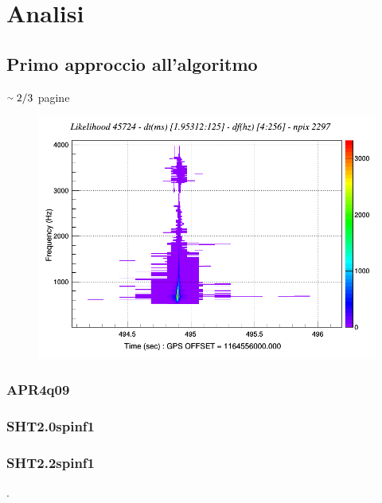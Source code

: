 \chapter{Analisi}
\label{chapter:analisi}
\section{Primo approccio all'algoritmo}
\label{section:analisiSimSingole}
\begin{center}
	$\smallsim 2/3$ pagine
\end{center}
\begin{center}
	\begin{figure}[H]
		\centering
		\includegraphics[scale=0.38, angle=0]{figures/Capitolo_4/APR4_q09/layer4_10__distance5_1250_2500_5000/ced_1164556010_790_O4I_GN_LHV_SIM_PMNS_APR4_q09_NEW_4_job1/L1H1V1_1164556494.250_1164556494.250_1164556494.250/l_tfmap_scalogram.png}
		\setlength{\belowcaptionskip}{-20pt}
		\caption{}
		\label{fig:APR4q09/likelihood}
	\end{figure}
\end{center}	
\subsection{APR4q09}
\subsection{SHT2.0spinf1}
\subsection{SHT2.2spinf1}
\lipsum[7]\cite{hartle2003gravity}.

